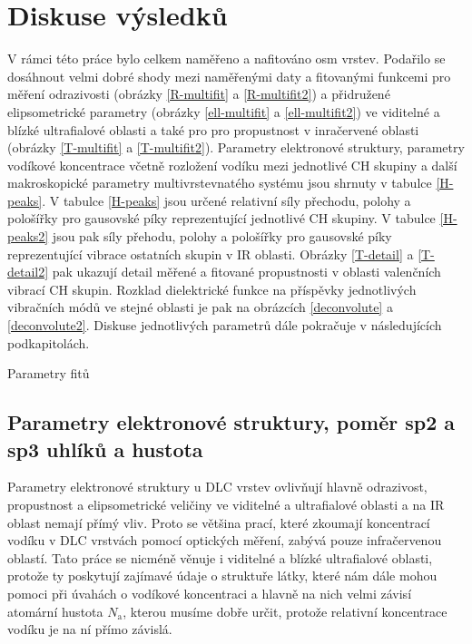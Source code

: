 \chapter{Diskuse výsledků}
V rámci této práce bylo celkem naměřeno a nafitováno osm vrstev. Podařilo se dosáhnout velmi dobré shody mezi naměřenými daty a fitovanými funkcemi pro měření odrazivosti (obrázky \ref{R-multifit} a \ref{R-multifit2}) a přidružené elipsometrické parametry (obrázky \ref{ell-multifit} a \ref{ell-multifit2}) ve viditelné a blízké ultrafialové oblasti a také pro pro propustnost v inračervené oblasti (obrázky \ref{T-multifit} a \ref{T-multifit2}). Parametry elektronové struktury, parametry vodíkové koncentrace včetně rozložení vodíku mezi jednotlivé CH skupiny a další makroskopické parametry multivrstevnatého systému jsou shrnuty v tabulce \ref{H-peaks}. 
V tabulce \ref{H-peaks} jsou určené relativní síly přechodu, polohy a pološířky pro gausovské píky reprezentující jednotlivé CH skupiny. V tabulce \ref{H-peaks2} jsou pak síly přehodu, polohy a pološířky pro gausovské píky reprezentující vibrace ostatních skupin v IR oblasti.
Obrázky \ref{T-detail} a \ref{T-detail2} pak ukazují detail měřené a fitované propustnosti v oblasti valenčních vibrací CH skupin. Rozklad dielektrické funkce na příspěvky jednotlivých vibračních módů ve stejné oblasti je pak na obrázcích \ref{deconvolute} a \ref{deconvolute2}. Diskuse jednotlivých parametrů dále pokračuje v následujících podkapitolách.

\begin{table}[tbhp]
 \centering
	\renewcommand{\tabcolsep}{4pt}
 
 \caption{Parametry fitů}
\label{fitparams}
\end{table}

\section{Parametry elektronové struktury, poměr sp2 a sp3 uhlíků a hustota}
Parametry elektronové struktury u DLC vrstev ovlivňují hlavně odrazivost, propustnost a elipsometrické veličiny ve viditelné a ultrafialové oblasti a na IR oblast nemají přímý vliv. 
Proto se většina prací, které zkoumají koncentrací vodíku v DLC vrstvách pomocí optických měření, zabývá pouze infračervenou oblastí. Tato práce se nicméně věnuje i viditelné a blízké ultrafialové oblasti, protože ty poskytují zajímavé údaje o struktuře látky, které nám dále mohou pomoci při úvahách o vodíkové koncentraci a hlavně na nich velmi závisí atomární hustota $N_\mathrm{a}$, kterou musíme dobře určit, protože relativní koncentrace vodíku je na ní přímo závislá.  

